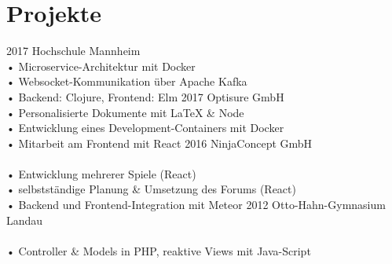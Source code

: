 \documentclass[
]{friggeri-cv}
\begin{document}
\section{Projekte}

\begin{entrylist}
  \entry
    {2017}
    {}
    {Hochschule Mannheim}
    {\\%
      • Microservice-Architektur mit Docker\\
      • Websocket-Kommunikation über Apache Kafka\\
      • Backend: Clojure, Frontend: Elm
    }
  \entry
    {2017}
    {}
    {Optisure GmbH}
    {\\%
      • Personalisierte Dokumente mit \LaTeX{} \& Node\\
      • Entwicklung eines Development-Containers mit Docker\\
      • Mitarbeit am Frontend mit React
    }
  \entry
    {2016}
    {}
    {NinjaConcept GmbH}
    {\\\\%
      • Entwicklung mehrerer Spiele (React)\\
      • selbstständige Planung \& Umsetzung des Forums (React)\\
      • Backend und Frontend-Integration mit Meteor
    }
  \entry
    {2012}
    {}
    {Otto-Hahn-Gymnasium Landau}
    {\\\\%
      • Controller \& Models in PHP, reaktive Views mit Java-Script
    }
\end{entrylist}
\end{document}
